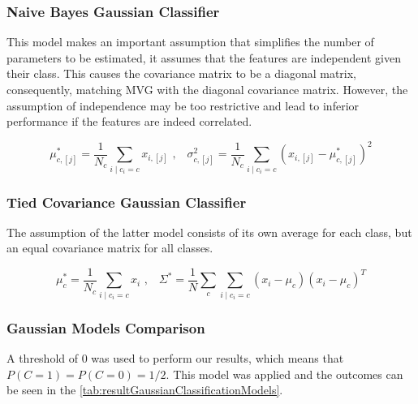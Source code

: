 
\subsubsection{Naive Bayes Gaussian Classifier}
\label{subsubsec:naiveBayesGaussianClassifier}
This model makes an important assumption that simplifies the number of parameters to be estimated,
it assumes that the features are independent given their class.
This causes the covariance matrix to be a diagonal matrix, consequently, matching MVG with the diagonal covariance matrix.
However, the assumption of independence may be too restrictive and lead to inferior performance if the features are indeed correlated.

\begin{equation}
    \mu_{c,[j]}^* = \frac{1}{N_c} \sum_{i\mid c_i = c} x_{i,[j]}\text{ ,}\quad
    \sigma_{c,[j]}^2 = \frac{1}{N_c} \sum_{i\mid c_i = c} (x_{i,[j]} - \mu_{c,[j]}^*)^2
    \label{eq:meanAndVarianceNBG}
\end{equation}


\subsubsection{Tied Covariance Gaussian Classifier}
\label{subsubsec:tiedCovarianceGaussianClassifier}
The assumption of the latter model consists of its own average for each class, but an equal covariance matrix for all classes.

\begin{equation}
    \mu_c^* = \frac{1}{N_c} \sum_{i\mid c_i=c} x_i\text{ ,}\quad
    \Sigma^* = \frac{1}{N} \sum_{c} \sum_{i\mid c_i = c} (x_{i} - \mu_c)(x_{i} - \mu_c)^T
    \label{eq:tiedCovariance}
\end{equation}

\subsubsection{Gaussian Models Comparison}
\label{subsubsec:gaussianModelsComparison}
A threshold of \(0\) was used to perform our results, which means that \(P(C=1)=P(C=0)=1/2\). This model was applied and
the outcomes can be seen in the \autoref{tab:resultGaussianClassificationModels}.

